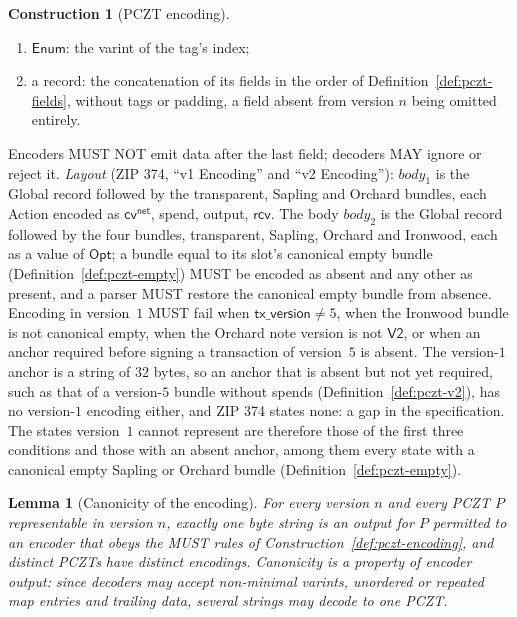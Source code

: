 \documentclass[11pt,a4paper]{article}
\newtheorem{lemma}[theorem]{Lemma}
\theoremstyle{definition}
\newtheorem{construction}[theorem]{Construction}
\newcommand{\cvsym}{\mathsf{cv}}
\newcommand{\rcv}{\ensuremath{\mathsf{rcv}}}
\begin{document}
\begin{construction}[PCZT encoding]
\begin{enumerate}[label=(\roman*)]
  by each key and its value. Encoders MUST emit the entries in strictly
  ascending lexicographic byte order of the unencoded keys, without
  duplicates; decoders MAY accept other orders and duplicates;
\item $\mathsf{Enum}$: the varint of the tag's index;
\item a record: the concatenation of its fields in the order of
  Definition~\ref{def:pczt-fields}, without tags or padding, a field absent
  from version $n$ being omitted entirely.
\end{enumerate}
Encoders MUST NOT emit data after the last field; decoders MAY ignore or
reject it. \emph{Layout} (ZIP 374, ``v1 Encoding'' and ``v2 Encoding''):
$\mathit{body}_1$ is the Global record followed by the transparent, Sapling
and Orchard bundles, each Action encoded as $\cvsym^{\mathsf{net}}$, spend,
output, $\rcv$. The body $\mathit{body}_2$ is the Global record followed by
the four bundles, transparent, Sapling, Orchard and Ironwood, each as a
value of $\mathsf{Opt}$; a bundle equal to its slot's canonical empty bundle
(Definition~\ref{def:pczt-empty}) MUST be encoded as absent and any other as
present, and a parser MUST restore the canonical empty bundle from absence.
Encoding in version~$1$ MUST fail when $\mathsf{tx\_version} \ne 5$, when
the Ironwood bundle is not canonical empty, when the Orchard note version
is not $\mathsf{V2}$, or when an anchor required before signing a
transaction of version~$5$ is absent. The version-$1$ anchor is a string of
$32$ bytes, so an anchor that is absent but not yet required, such as that
of a version-$5$ bundle without spends (Definition~\ref{def:pczt-v2}), has
no version-$1$ encoding either, and ZIP 374 states none: a gap in the
specification. The states version~$1$ cannot represent are therefore those
of the first three conditions and those with an absent anchor, among them
every state with a canonical empty Sapling or Orchard bundle
(Definition~\ref{def:pczt-empty}).
\end{construction}

\begin{lemma}[Canonicity of the encoding]\label{lem:pczt-canonical}
For every version $n$ and every PCZT $P$ representable in version $n$,
exactly one byte string is an output for $P$ permitted to an encoder that
obeys the MUST rules of Construction~\ref{def:pczt-encoding}, and distinct
PCZTs have distinct encodings. Canonicity is a property of encoder output:
since decoders may accept non-minimal varints, unordered or repeated map
entries and trailing data, several strings may decode to one PCZT.
\end{lemma}
\end{document}
